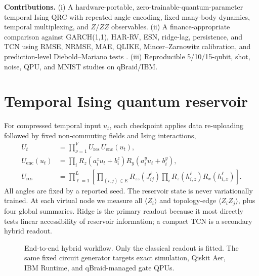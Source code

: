 \documentclass[11pt]{article}
\begin{document}
\textbf{Contributions.} (i) A hardware-portable, zero-trainable-quantum-parameter temporal Ising QRC with repeated angle encoding, fixed many-body dynamics, temporal multiplexing, and $Z/ZZ$ observables. (ii) A finance-appropriate comparison against GARCH(1,1), HAR-RV, ESN, ridge-lag, persistence, and TCN using RMSE, NRMSE, MAE, QLIKE, Mincer--Zarnowitz calibration, and prediction-level Diebold--Mariano tests \cite{bollerslev1986garch,corsi2009har,patton2011volatility,diebold1995comparing}. (iii) Reproducible 5/10/15-qubit, shot, noise, QPU, and MNIST studies on qBraid/IBM.

\section{Temporal Ising quantum reservoir}
For compressed temporal input $u_t$, each checkpoint applies data re-uploading followed by fixed non-commuting fields and Ising interactions,
\begin{align}
U_t &= \prod_{\nu=1}^{V} U_{\mathrm{res}}\,U_{\mathrm{enc}}(u_t),\\
U_{\mathrm{enc}}(u_t) &= \prod_i R_z(a_i^z u_t+b_i^z)R_y(a_i^y u_t+b_i^y),\\
U_{\mathrm{res}} &= \prod_{\ell=1}^{L}\left[\prod_{(i,j)\in E}R_{zz}(J_{ij}^{\ell})\prod_i R_z(h_{i,z}^{\ell})R_x(h_{i,x}^{\ell})\right].
\end{align}
All angles are fixed by a reported seed. The reservoir state is never variationally trained. At each virtual node we measure all $\langle Z_i\rangle$ and topology-edge $\langle Z_iZ_j\rangle$, plus four global summaries. Ridge is the primary readout because it most directly tests linear accessibility of reservoir information; a compact TCN is a secondary hybrid readout.

\begin{figure}[t]
\centering
{}
\caption{End-to-end hybrid workflow. Only the classical readout is fitted. The same fixed circuit generator targets exact simulation, Qiskit Aer, IBM Runtime, and qBraid-managed gate QPUs.}
\label{fig:pipeline}
\end{figure}
\end{document}
